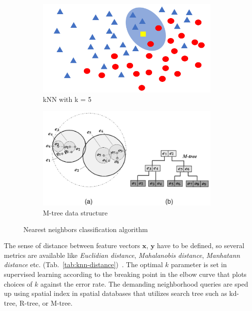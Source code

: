 \begin{figure}[ht]
    \centering
    \begin{subfigure}[b]{0.49\textwidth}
        \includegraphics[width=\textwidth]{assets/analysis/kNN.png}
        \caption{kNN with k = 5}
        \label{fig:knn}
    \end{subfigure}
    \hfill
    \begin{subfigure}[b]{0.49\textwidth}
        \includegraphics[width=\textwidth]{assets/analysis/M-tree.png}
        \caption{M-tree data structure}
        \label{fig:m-tree}
    \end{subfigure}
    \caption{Nearest neighbors classification algorithm~\cite{chen_skyline_2009}}
\end{figure}

The sense of distance between feature vectors $\mathbf{x}$, $\mathbf{y}$ have to be defined, so several metrics are available like \emph{Euclidian distance}, \emph{Mahalanobis distance}, \emph{Manhatann distance} etc. (Tab.~\ref{tab:knn-distance})~\cite{sheng_review_2020, abu_alfeilat_effects_2019}. The optimal $k$ parameter is set in supervised learning according to the breaking point in the elbow curve that plots choices of $k$ against the error rate. The demanding neighborhood queries are sped up using spatial index in spatial databases that utilizes search tree such as kd-tree, R-tree, or M-tree. 

